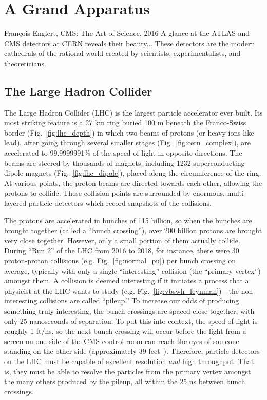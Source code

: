 \chapter{A Grand Apparatus}\label{ch:lhc_cms}
\begin{aquote}{Fran\c{c}ois Englert, CMS: The Art of Science, 2016}
    A glance at the ATLAS and CMS detectors at CERN reveals their beauty...
    These detectors are the modern cathedrals of the rational world created by scientists, experimentalists, and theoreticians. 
\end{aquote}

\section{The Large Hadron Collider}
The Large Hadron Collider (LHC) is the largest particle accelerator ever built. 
Its most striking feature is a 27 km ring buried 100 m beneath the Franco-Swiss border (Fig.~\ref{fig:lhc_depth}) in which two beams of protons (or heavy ions like lead), after going through several smaller stages (Fig.~\ref{fig:cern_complex}), are accelerated to 99.9999991\% of the speed of light in opposite directions. 
The beams are steered by thousands of magnets, including 1232 superconducting dipole magnets (Fig.~\ref{fig:lhc_dipole}), placed along the circumference of the ring. 
At various points, the proton beams are directed towards each other, allowing the protons to collide. 
These collision points are surrounded by enormous, multi-layered particle detectors which record snapshots of the collisions. 

The protons are accelerated in bunches of 115 billion, so when the bunches are brought together (called a ``bunch crossing''), over 200 billion protons are brought very close together.
However, only a small portion of them actually collide. 
During ``Run 2'' of the LHC from 2016 to 2018, for instance, there were 30 proton-proton collisions (e.g. Fig.~\ref{fig:normal_pu}) per bunch crossing on average, typically with only a single ``interesting'' collision (the ``primary vertex'') amongst them. %
A collision is deemed interesting if it initiates a process that a physicist at the LHC wants to study (e.g. Fig.~\ref{fig:vbswh_feynman})---the non-interesting collisions are called ``pileup.'' 
To increase our odds of producing something truly interesting, the bunch crossings are spaced close together, with only 25 nanoseconds of separation. 
To put this into context, the speed of light is roughly 1 ft/ns, so the next bunch crossing will occur before the light from a screen on one side of the CMS control room can reach the eyes of someone standing on the other side (approximately 39 feet~\cite{CMSP5Layout}).
Therefore, particle detectors on the LHC must be capable of excellent resolution \textit{and} high throughput. 
That is, they must be able to resolve the particles from the primary vertex amongst the many others produced by the pileup, all within the 25 ns between bunch crossings. 

